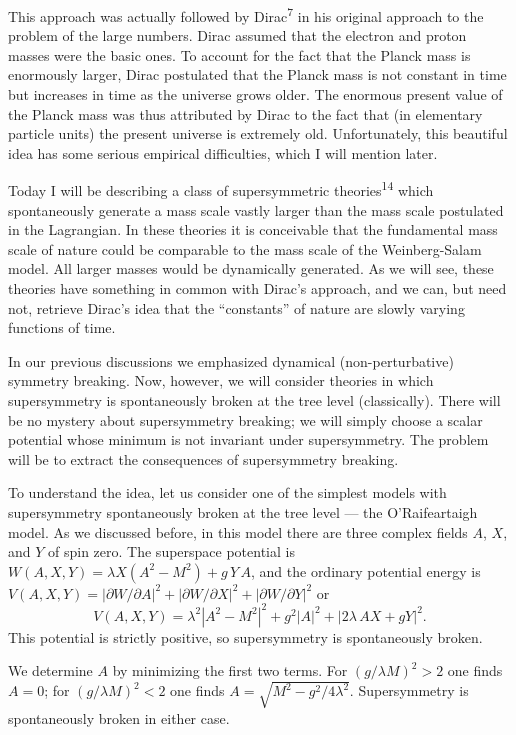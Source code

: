 This approach was actually followed by Dirac\textsuperscript{7} in his original
approach to the problem of the large numbers. Dirac assumed that
the electron and proton masses were the basic ones. To account for
the fact that the Planck mass is enormously larger, Dirac postulated
that the Planck mass is not constant in time but increases in time as
the universe grows older. The enormous present value of the Planck
mass was thus attributed by Dirac to the fact that (in elementary
particle units) the present universe is extremely old. Unfortunately,
this beautiful idea has some serious empirical difficulties,
which I will mention later.

Today I will be describing a class of supersymmetric theories\textsuperscript{14}
which spontaneously generate a mass scale vastly larger than the
mass scale postulated in the Lagrangian. In these theories it is
conceivable that the fundamental mass scale of nature could be comparable
to the mass scale of the Weinberg-Salam model. All larger
masses would be dynamically generated. As we will see, these
theories have something in common with Dirac's approach, and we can,
but need not, retrieve Dirac's idea that the ``constants'' of nature
are slowly varying functions of time.

In our previous discussions we emphasized dynamical (non-perturbative)
symmetry breaking. Now, however, we will consider theories in which
supersymmetry is spontaneously broken at the tree
level (classically). There will be no mystery about supersymmetry
breaking; we will simply choose a scalar potential whose minimum is
not invariant under supersymmetry. The problem will be to extract
the consequences of supersymmetry breaking.

To understand the idea, let us consider one of the simplest
models with supersymmetry spontaneously broken at the tree level ---
the O'Raifeartaigh model. As we discussed before, in this model
there are three complex fields $A$, $X$, and $Y$ of spin zero. The superspace
potential is $W(A,X,Y) = \lambda X(A^2 - M^2) + g\, Y\, A$, and the ordinary
potential energy is $V(A,X,Y) = |\partial W/\partial A|^2 + |\partial W/\partial X|^2 + |\partial W/\partial Y|^2$ or
\begin{equation}
V(A,X,Y) = \lambda^2 |A^2 - M^2|^2 + g^2 |A|^2 + |2 \lambda\, A X + gY|^2 .
\tag{42}
\end{equation}
This potential is strictly positive, so supersymmetry is spontaneously
broken.

We determine $A$ by minimizing the first two terms. For $(g/\lambda M)^2 > 2$
one finds $A = 0$; for $(g/\lambda M)^2 < 2$ one finds $A = \sqrt{M^2 - g^2/4\lambda^2}$. Supersymmetry
is spontaneously broken in either case.

